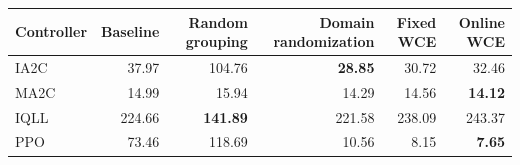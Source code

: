 \begin{tabular}{lrrrrr}
\hline
Controller & Baseline & Random grouping & Domain randomization & Fixed WCE & Online WCE \\
\hline
IA2C & 37.97 & 104.76 & \textbf{28.85} & 30.72 & 32.46 \\
MA2C & 14.99 & 15.94 & 14.29 & 14.56 & \textbf{14.12} \\
IQLL & 224.66 & \textbf{141.89} & 221.58 & 238.09 & 243.37 \\
PPO & 73.46 & 118.69 & 10.56 & 8.15 & \textbf{7.65} \\
\hline
\end{tabular}
